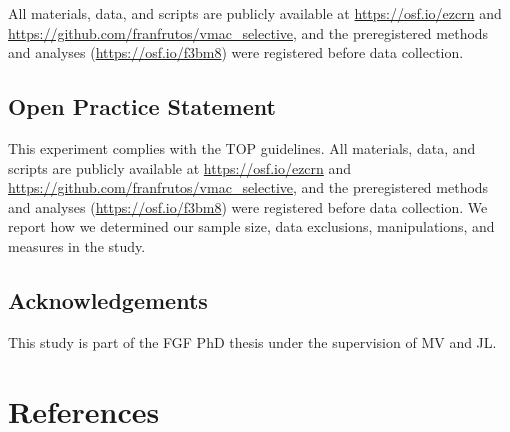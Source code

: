 \documentclass[
  man,
  floatsintext,
  longtable,
  nolmodern,
  notxfonts,
  notimes,
  mask,
  colorlinks=true,linkcolor=blue,citecolor=blue,urlcolor=blue]{apa7}
\begin{document}
All materials, data, and scripts are publicly available at
\url{https://osf.io/ezcrn} and
\url{https://github.com/franfrutos/vmac_selective}, and the
preregistered methods and analyses (\url{https://osf.io/f3bm8}) were
registered before data collection.

\subsection{Open Practice Statement}\label{open-practice-statement}

This experiment complies with the TOP guidelines. All materials, data,
and scripts are publicly available at \url{https://osf.io/ezcrn} and
\url{https://github.com/franfrutos/vmac_selective}, and the
preregistered methods and analyses (\url{https://osf.io/f3bm8}) were
registered before data collection. We report how we determined our
sample size, data exclusions, manipulations, and measures in the study.

\subsection{Acknowledgements}\label{acknowledgements}

This study is part of the FGF PhD thesis under the supervision of MV and
JL.

\section{References}\label{references}
\end{document}
